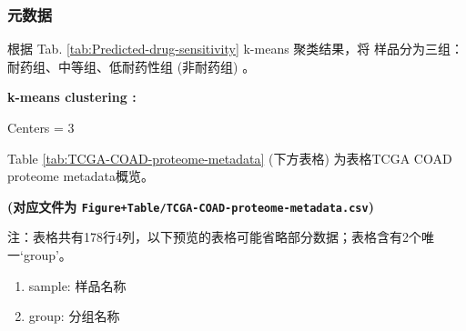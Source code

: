 \documentclass[
]{article}
\providecommand{\tightlist}{%
  \setlength{\itemsep}{0pt}\setlength{\parskip}{0pt}}
\begin{document}
\hypertarget{ux5143ux6570ux636e}{%
\subsubsection{元数据}\label{ux5143ux6570ux636e}}

根据 Tab. \ref{tab:Predicted-drug-sensitivity} k-means 聚类结果，将
样品分为三组：耐药组、中等组、低耐药性组 (非耐药组) 。

\begin{center}\begin{tcolorbox}[colback=gray!10, colframe=gray!50, width=0.9\linewidth, arc=1mm, boxrule=0.5pt]
\textbf{
k-means clustering
:}

\vspace{0.5em}

    Centers = 3

\vspace{2em}
\end{tcolorbox}
\end{center}

Table \ref{tab:TCGA-COAD-proteome-metadata} (下方表格) 为表格TCGA COAD proteome metadata概览。

\textbf{(对应文件为 \texttt{Figure+Table/TCGA-COAD-proteome-metadata.csv})}

\begin{center}\begin{tcolorbox}[colback=gray!10, colframe=gray!50, width=0.9\linewidth, arc=1mm, boxrule=0.5pt]注：表格共有178行4列，以下预览的表格可能省略部分数据；表格含有2个唯一`group'。
\end{tcolorbox}
\end{center}
\begin{center}\begin{tcolorbox}[colback=gray!10, colframe=gray!50, width=0.9\linewidth, arc=1mm, boxrule=0.5pt]\begin{enumerate}\tightlist
\item sample:  样品名称
\item group:  分组名称
\end{enumerate}\end{tcolorbox}
\end{center}
\end{document}
